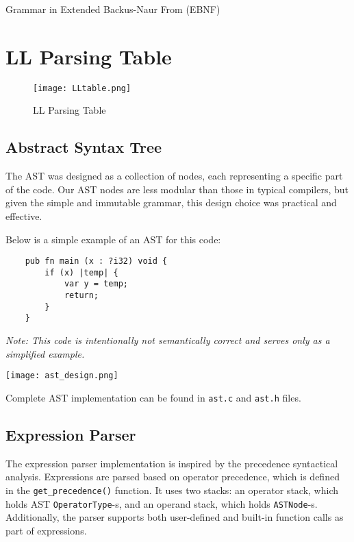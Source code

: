 \documentclass[12pt,a4paper]{article}
\begin{document}
\vspace{1cm}
\begin{center}
    \caption{Grammar in Extended Backus-Naur From (EBNF)}
\end{center}

\newpage
\section*{LL Parsing Table}

\begin{figure}[ht]
    \centering
    \texttt{[image: LLtable.png]} %
    \caption{LL Parsing Table}
    \label{fig:ll_table}
\end{figure}

\subsection{Abstract Syntax Tree \cite{ast}}
The AST was designed as a collection of nodes, each representing a specific part of the code. Our AST nodes are less modular than those in typical compilers, but given the simple and immutable grammar, this design choice was practical and effective.

Below is a simple example of an AST for this code:
\begin{verbatim}
    pub fn main (x : ?i32) void {
        if (x) |temp| {
            var y = temp;
            return;
        }
    } 
\end{verbatim}
\textit{Note: This code is intentionally not semantically correct and serves only as a simplified example.}

\begin{center}
    \texttt{[image: ast\_design.png]}
\end{center}

Complete AST implementation can be found in \texttt{ast.c} and \texttt{ast.h} files.

\subsection{Expression Parser}
The expression parser implementation is inspired by the precedence syntactical analysis. Expressions are parsed based on operator precedence, which is defined in the \texttt{get\_precedence()} function. It uses two stacks: an operator stack, which holds AST \texttt{OperatorType}-s, and an operand stack, which holds \texttt{ASTNode}-s. Additionally, the parser supports both user-defined and built-in function calls as part of expressions.
\end{document}
